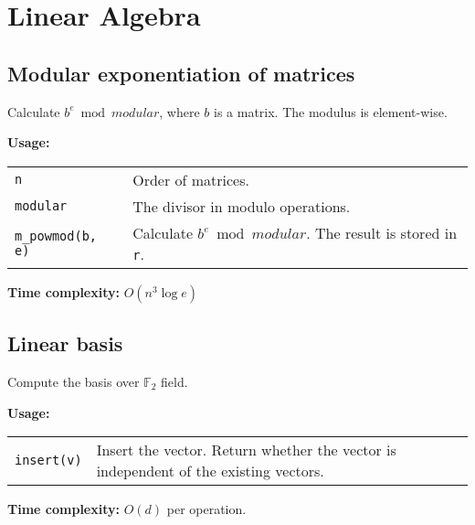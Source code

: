 \section{Linear Algebra}
\subsection{Modular exponentiation of matrices}
Calculate $b^e \bmod modular$, where $b$ is a matrix. The modulus is element-wise.\par
\textbf{Usage:} \\[0.1cm]
\begin{tabular}{p{3cm} p{8.5cm}}
  \lstinline|n| & Order of matrices. \\
  \lstinline|modular| & The divisor in modulo operations. \\
  \lstinline|m_powmod(b, e)| & Calculate $b^e \bmod modular$. The result is stored in \lstinline|r|.
\end{tabular} \par
\textbf{Time complexity:} $O(n^3 \log e)$ \par


\subsection{Linear basis}
Compute the basis over $\mathbb{F}_2$ field. \par
\textbf{Usage:} \\[0.1cm]
\begin{tabular}{p{2cm} p{9.5cm}}
  \lstinline|insert(v)| & Insert the vector. Return whether the vector is independent of the existing vectors. \\
\end{tabular} \par
\textbf{Time complexity:} $O(d)$ per operation. \par


